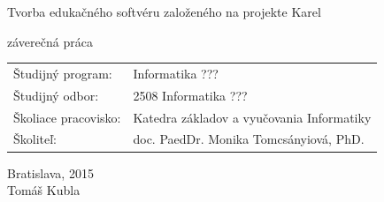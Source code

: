 \documentclass[12pt, oneside]{book}
\def\mfyear{2015}
\def\mftitle{Tvorba edukačného softvéru založeného na projekte Karel}
\def\mfthesistype{záverečná práca}
\def\mfauthor{Tomáš Kubla}
\def\mfadvisor{doc. PaedDr. Monika Tomcsányiová, PhD.}
\def\mfplacedate{Bratislava, \mfyear}
\def\odbor{2508 Informatika ??? } %
\def\program{ Informatika ??? }
\def\stredisko{ Katedra základov a vyučovania Informatiky }
\begin{document}
\begin{minipage}{1.1\textwidth}
\begin{flushright}
\bigskip\bigskip
\begin{center}
\sc\LARGE\mftitle
\end{center}
\bigskip
\centerline{\sc\mfthesistype}
\end{flushright}

\bigskip
\vspace{3cm}
\bigskip
\begin{tabular}{ll}
Študijný program: & \program \\
Študijný odbor: & \odbor \\
Školiace pracovisko: & \stredisko \\
Školiteľ: & \mfadvisor \\
\end{tabular}

\end{minipage}
\vfill

\noindent \mfplacedate\\
\indent\mfauthor

\eject %




\end{document}
